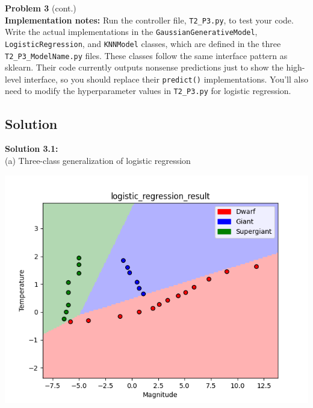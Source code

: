 \documentclass[submit]{harvardml}
\begin{document}
\newpage

\begin{framed}
\noindent\textbf{Problem 3} (cont.)\\


\textbf{Implementation notes:} Run the controller file, \texttt{T2\_P3.py},
to test your code. Write the actual implementations in the \texttt{GaussianGenerativeModel},
\texttt{LogisticRegression}, and \texttt{KNNModel} classes, which are defined in the three
\texttt{T2\_P3\_ModelName.py} files. These classes follow the same interface pattern
as sklearn. Their code
currently outputs nonsense predictions just to show the
high-level interface, so you should replace their \texttt{predict()} implementations.
You'll also need to modify the hyperparameter
values in \texttt{T2\_P3.py} for logistic regression.
\end{framed}

\newpage

\subsection*{Solution}
\noindent\textbf{Solution 3.1:}\\
(a) Three-class generalization of logistic regression
\begin{center}
    \includegraphics[scale=0.7]{logistic_regression_result.png}
\end{center}
\end{document}
